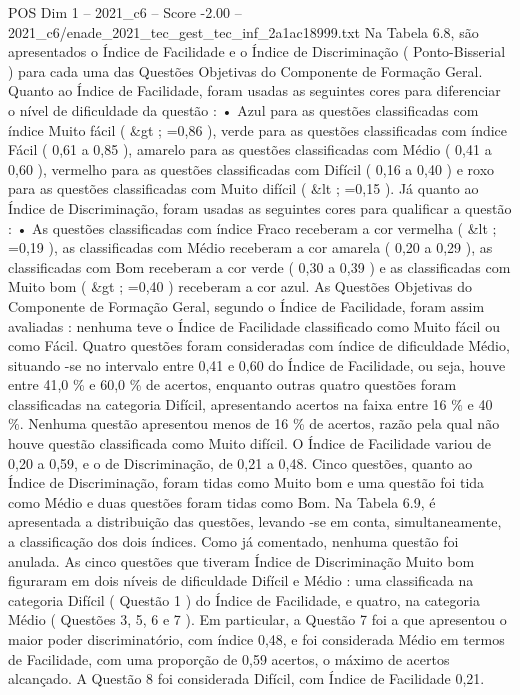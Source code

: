 \begin{textsample}{POS Dim 1 – 2021\_c6 – Score -2.00 – 2021\_c6/enade\_2021\_tec\_gest\_tec\_inf\_2a1ac18999.txt}
Na Tabela 6.8, são apresentados o Índice de Facilidade e o Índice de Discriminação ( Ponto-Bisserial ) para cada uma das Questões Objetivas do Componente de Formação Geral.
Quanto ao Índice de Facilidade, foram usadas as seguintes cores para diferenciar o nível de dificuldade da questão : • Azul para as questões classificadas com índice Muito fácil ( \&gt ; =0,86 ), verde para as questões classificadas com índice Fácil ( 0,61 a 0,85 ), amarelo para as questões classificadas com Médio ( 0,41 a 0,60 ), vermelho para as questões classificadas com Difícil ( 0,16 a 0,40 ) e roxo para as questões classificadas com Muito difícil ( \&lt ; =0,15 ).
Já quanto ao Índice de Discriminação, foram usadas as seguintes cores para qualificar a questão : • As questões classificadas com índice Fraco receberam a cor vermelha ( \&lt ; =0,19 ), as classificadas com Médio receberam a cor amarela ( 0,20 a 0,29 ), as classificadas com Bom receberam a cor verde ( 0,30 a 0,39 ) e as classificadas com Muito bom ( \&gt ; =0,40 ) receberam a cor azul.
As Questões Objetivas do Componente de Formação Geral, segundo o Índice de Facilidade, foram assim avaliadas : nenhuma teve o Índice de Facilidade classificado como Muito fácil ou como Fácil.
Quatro questões foram consideradas com índice de dificuldade Médio, situando -se no intervalo entre 0,41 e 0,60 do Índice de Facilidade, ou seja, houve entre 41,0 \% e 60,0 \% de acertos, enquanto outras quatro questões foram classificadas na categoria Difícil, apresentando acertos na faixa entre 16 \% e 40 \%.
Nenhuma questão apresentou menos de 16 \% de acertos, razão pela qual não houve questão classificada como Muito difícil.
O Índice de Facilidade variou de 0,20 a 0,59, e o de Discriminação, de 0,21 a 0,48.
Cinco questões, quanto ao Índice de Discriminação, foram tidas como Muito bom e uma questão foi tida como Médio e duas questões foram tidas como Bom.
Na Tabela 6.9, é apresentada a distribuição das questões, levando -se em conta, simultaneamente, a classificação dos dois índices.
Como já comentado, nenhuma questão foi anulada.
As cinco questões que tiveram Índice de Discriminação Muito bom figuraram em dois níveis de dificuldade Difícil e Médio : uma classificada na categoria Difícil ( Questão 1 ) do Índice de Facilidade, e quatro, na categoria Médio ( Questões 3, 5, 6 e 7 ).
Em particular, a Questão 7 foi a que apresentou o maior poder discriminatório, com índice 0,48, e foi considerada Médio em termos de Facilidade, com uma proporção de 0,59 acertos, o máximo de acertos alcançado.
A Questão 8 foi considerada Difícil, com Índice de Facilidade 0,21.

\end{textsample}
